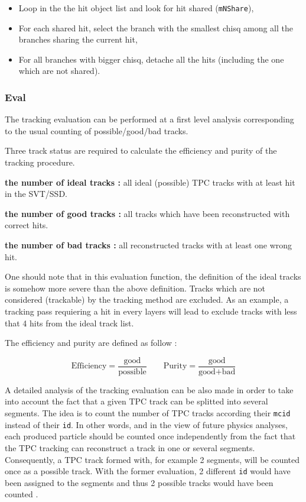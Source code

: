 \documentclass[twoside]{article}
\begin{document}
\begin{itemize}
\item Loop in the the hit object list and look for hit shared (\verb+mNShare+),
\item For each shared hit, select the branch with the smallest chisq among all the branches sharing the current hit,
\item For all branches with bigger chisq,  detache all the  hits (including the one which are not shared). 
\end{itemize}

\subsubsection{Eval}
\label{sec:Evalq}

The tracking evaluation can be performed at a first level analysis
corresponding to the usual counting of possible/good/bad tracks.

Three track status are required to calculate the efficiency and purity
of the tracking procedure. 

{\bf the number of ideal tracks :} all ideal (possible) TPC tracks with at least hit in the SVT/SSD.

{\bf the number of good tracks :} all  tracks which have been 
reconstructed with correct hits.

{\bf the number of bad tracks :} all reconstructed tracks with at least 
one wrong hit. 

One should note that in this evaluation function, the definition of
the ideal tracks is somehow more severe than the above
definition. Tracks which are not considered (trackable) by the
tracking method are excluded. As an example, a tracking pass
requiering a hit in every layers will lead to exclude tracks with less
that 4 hits from the ideal track list.

The efficiency and purity are defined as follow :

$$ \mbox{Efficiency} = \frac{\mbox{good}}{\mbox{possible}} \qquad \mbox{Purity} = \frac{\mbox{good}}{\mbox{good} + \mbox{bad}}$$

A detailed analysis of the tracking evaluation can be also made in
order to take into account the fact that a given TPC track can be
splitted into several segments. The idea is to count the number of TPC
tracks according their \verb+mcid+ instead of their \verb+id+.  In
other words, and in the view of future physics analyses, each produced
particle should be counted once independently from the fact that the
TPC tracking can reconstruct a track in one or several
segments. Consequently, a TPC track formed with, for example 2
segments, will be counted once as a possible track. With the former
evaluation, 2 different \verb+id+ would have been assigned to the segments
and thus 2 possible tracks would have been counted .
\end{document}
